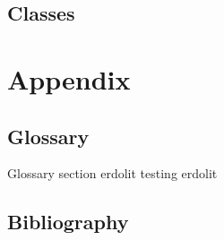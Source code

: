 \documentclass[10pt,twoside,twocolumn,openany,nomultitoc]{book}
\begin{document}
\section{Classes}

\chapter{Appendix}
\section{Glossary}

Glossary section \Gls{erdolit} testing
\Gls{erdolit}
\printglossaries

\section{Bibliography}
\nocite{*}
\printbibliography



\end{document}
